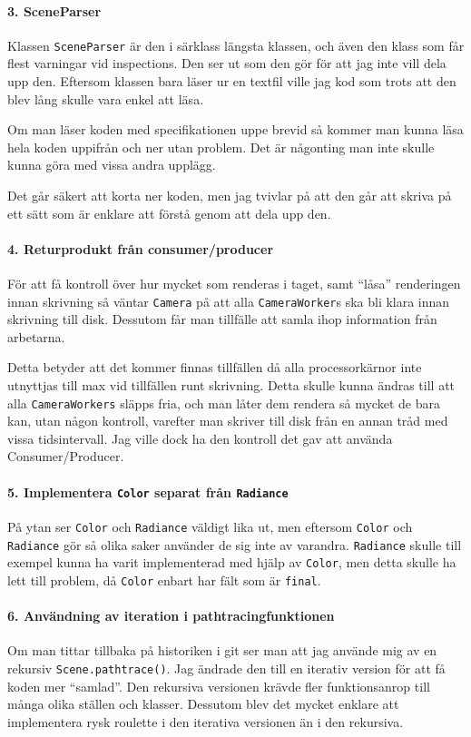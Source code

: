 \documentclass{article}
\begin{document}
\paragraph{3. SceneParser}
Klassen \texttt{SceneParser} är den i särklass längsta klassen, och
även den klass som får flest varningar vid inspections. Den ser ut som
den gör för att jag inte vill dela upp den. Eftersom klassen bara
läser ur en textfil ville jag kod som trots att den blev lång skulle
vara enkel att läsa.

Om man läser koden med specifikationen uppe brevid så kommer man kunna
läsa hela koden uppifrån och ner utan problem. Det är någonting man
inte skulle kunna göra med vissa andra upplägg.

Det går säkert att korta ner koden, men jag tvivlar på att den går att
skriva på ett sätt som är enklare att förstå genom att dela upp den.

\paragraph{4. Returprodukt från consumer/producer}
För att få kontroll över hur mycket som renderas i taget, samt
``låsa'' renderingen innan skrivning så väntar \texttt{Camera} på att
alla \texttt{CameraWorker}s ska bli klara innan skrivning till
disk. Dessutom får man tillfälle att samla ihop information från
arbetarna.

Detta betyder att det kommer finnas tillfällen då alla
processorkärnor inte utnyttjas till max vid tillfällen runt
skrivning. Detta skulle kunna ändras till att alla
\texttt{CameraWorkers} släpps fria, och man låter dem rendera så
mycket de bara kan, utan någon kontroll, varefter man skriver till
disk från en annan tråd med vissa tidsintervall. Jag ville dock ha den
kontroll det gav att använda Consumer/Producer.

\paragraph{5. Implementera \texttt{Color} separat från \texttt{Radiance}}
På ytan ser \texttt{Color} och \texttt{Radiance} väldigt lika ut, men
eftersom \texttt{Color} och \texttt{Radiance} gör så olika saker
använder de sig inte av varandra. \texttt{Radiance} skulle till
exempel kunna ha varit implementerad med hjälp av \texttt{Color}, men
detta skulle ha lett till problem, då \texttt{Color} enbart har fält
som är \texttt{final}.

\paragraph{6. Användning av iteration i pathtracingfunktionen}
Om man tittar tillbaka på historiken i git ser man att jag använde mig
av en rekursiv \texttt{Scene.pathtrace()}. Jag ändrade den till en
iterativ version för att få koden mer ``samlad''. Den rekursiva
versionen krävde fler funktionsanrop till många olika ställen och
klasser. Dessutom blev det mycket enklare att implementera rysk
roulette i den iterativa versionen än i den rekursiva.
\end{document}
